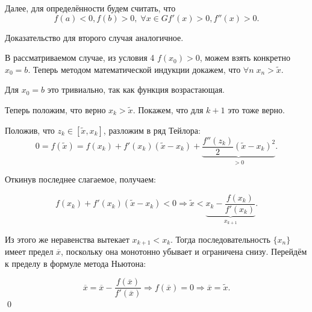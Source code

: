 \documentclass[../main.tex]{subfile}
\begin{document}
	Далее, для определённости будем считать, что
	\[f(a)<0, f(b)>0,\;\forall x\in G f'(x)>0, f''(x)>0.\]

	Доказательство для второго случая аналогичное.

	В рассматриваемом случае, из условия 4 $f(x_0)>0$, можем взять конкретно
	$x_0=b$. Теперь методом математической индукции докажем, что
	$\forall n\;x_n>\widetilde{x}$.

	Для $x_0=b$ это тривиально, так как функция возрастающая.

	Теперь положим, что верно $x_k>\widetilde{x}$. Покажем, что для $k+1$
	это тоже верно.

	Положив, что $z_k\in[\widetilde{x},x_k]$, разложим в ряд Тейлора:
	\[0=f(\widetilde{x})=f(x_k)+f'(x_k)(\widetilde{x}-x_k)+
		\underset{>0}{\underbrace{\frac{f''(z_k)}
		{2}(\widetilde{x}-x_k)^2}}.\]

	Откинув последнее слагаемое, получаем:

	\[f(x_k)+f'(x_k)(\widetilde{x}-x_k)<0\Rightarrow
		\widetilde{x}<\underset{x_{k+1}}{
			\underbrace{x_k-\frac{f(x_k)}{f'(x_k)}}}.\]

	Из этого же неравенства вытекает $x_{k+1}<x_k$. Тогда последовательность
	$\{x_n\}$ имеет предел $\overline{x}$, поскольку она монотонно убывает и
	ограничена снизу. Перейдём к пределу в формуле метода Ньютона:

	\[\overline{x}=\overline{x}-\frac{f(\overline{x})}{f'(\overline{x})}
		\Rightarrow f(\overline{x})=0\Rightarrow \overline{x}=
		\widetilde{x}.\]\qed
\end{document}
